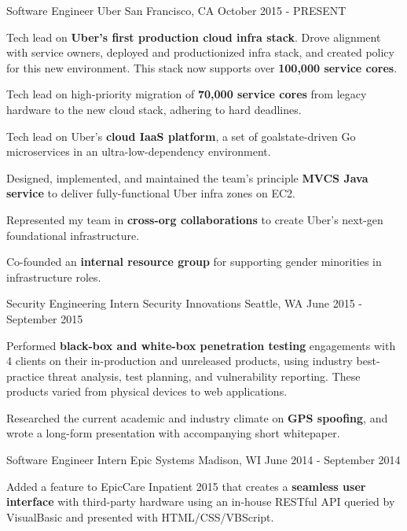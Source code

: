 
\begin{cventries}
  \cventry
    {Software Engineer} %
    {Uber} %
    {San Francisco, CA} %
    {October 2015 - PRESENT} %
    {
      \begin{cvitems} %
        \item {Tech lead on \textbf{Uber's first production cloud infra stack}. Drove alignment with service owners, deployed and productionized infra stack, and created policy for this new environment.  This stack now supports over \textbf{100,000 service cores}.}
        \item {Tech lead on high-priority migration of \textbf{70,000 service cores} from legacy hardware to the new cloud stack, adhering to hard deadlines.}
        \item {Tech lead on Uber's \textbf{cloud IaaS platform}, a set of goalstate-driven Go microservices in an ultra-low-dependency environment.}
        \item {Designed, implemented, and maintained the team's principle \textbf{MVCS Java service} to deliver fully-functional Uber infra zones on EC2.}
        \item {Represented my team in \textbf{cross-org collaborations} to create Uber's next-gen foundational infrastructure.}
        \item {Co-founded an \textbf{internal resource group} for supporting gender minorities in infrastructure roles.}
      \end{cvitems}
    }
    
  \cventry
    {Security Engineering Intern} %
    {Security Innovations} %
    {Seattle, WA} %
    {June 2015 - September 2015} %
    {
      \begin{cvitems} %
        \item {Performed \textbf{black-box and white-box penetration testing} engagements with 4 clients on their in-production and unreleased products, using industry best-practice threat analysis, test planning, and vulnerability reporting. These products varied from physical devices to web applications.}
        \item {Researched the current academic and industry climate on \textbf{GPS spoofing}, and wrote a long-form presentation with accompanying short whitepaper.}
      \end{cvitems}
    }

  \cventry
    {Software Engineer Intern} %
    {Epic Systems} %
    {Madison, WI} %
    {June 2014 - September 2014} %
    {
      \begin{cvitems} %
        \item {Added a feature to EpicCare Inpatient 2015 that creates a \textbf{seamless user interface} with third-party hardware using an in-house RESTful API queried by VisualBasic and presented with HTML/CSS/VBScript.}
      \end{cvitems}
    }

\end{cventries}
